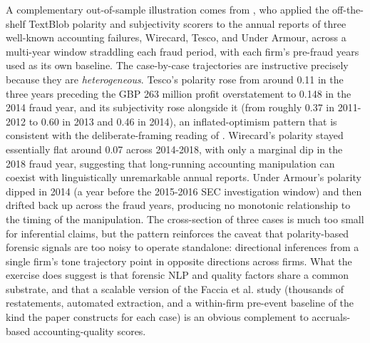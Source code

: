 A complementary out-of-sample illustration comes from \cite{faccia2024fraud}, who applied the off-the-shelf TextBlob polarity and subjectivity scorers to the annual reports of three well-known accounting failures, Wirecard, Tesco, and Under Armour, across a multi-year window straddling each fraud period, with each firm's pre-fraud years used as its own baseline. The case-by-case trajectories are instructive precisely because they are \textit{heterogeneous}. Tesco's polarity rose from around 0.11 in the three years preceding the GBP 263 million profit overstatement to 0.148 in the 2014 fraud year, and its subjectivity rose alongside it (from roughly 0.37 in 2011-2012 to 0.60 in 2013 and 0.46 in 2014), an inflated-optimism pattern that is consistent with the deliberate-framing reading of \cite{larcker2012detecting}. Wirecard's polarity stayed essentially flat around 0.07 across 2014-2018, with only a marginal dip in the 2018 fraud year, suggesting that long-running accounting manipulation can coexist with linguistically unremarkable annual reports. Under Armour's polarity dipped in 2014 (a year before the 2015-2016 SEC investigation window) and then drifted back up across the fraud years, producing no monotonic relationship to the timing of the manipulation. The cross-section of three cases is much too small for inferential claims, but the pattern reinforces the \cite{larcker2012detecting} caveat that polarity-based forensic signals are too noisy to operate standalone: directional inferences from a single firm's tone trajectory point in opposite directions across firms. What the exercise does suggest is that forensic NLP and quality factors share a common substrate, and that a scalable version of the Faccia et al. study (thousands of restatements, automated extraction, and a within-firm pre-event baseline of the kind the paper constructs for each case) is an obvious complement to accruals-based accounting-quality scores.

